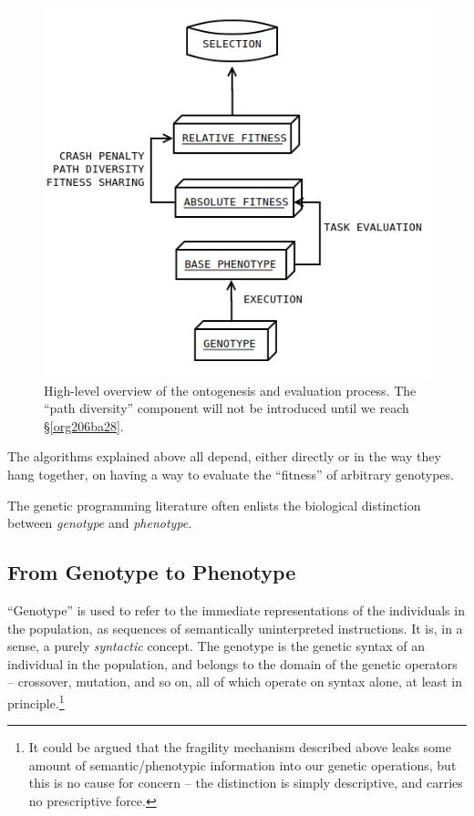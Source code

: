 \documentclass[12pt,glossary]{dalthesis}
\begin{document}
\begin{figure}[htbp]
\centering
\includegraphics[width=.9\linewidth]{../images/evaluation_model.png}
\caption{\label{fig:org589d021}
High-level overview of the ontogenesis and evaluation process. The ``path diversity'' component will not be introduced until we reach \S \ref{org206ba28}.}
\end{figure}

The algorithms explained above all depend, either directly or in the way they
hang together, on having a way to evaluate the ``fitness'' of arbitrary genotypes.

The genetic programming literature often enlists the biological distinction
between \emph{genotype} and \emph{phenotype}.

\subsection{From Genotype to Phenotype}
\label{sec:orgf649ce0}
\label{org89128b0}

``Genotype'' is used to refer to the immediate representations of the individuals
in the population, as sequences of semantically uninterpreted instructions. It
is, in a sense, a purely \emph{syntactic} concept. The genotype is the genetic syntax
of an individual in the population, and belongs to the domain of the genetic
operators -- crossover, mutation, and so on, all of which operate on syntax alone,
at least in principle.\footnote{It could be argued that the fragility mechanism described above leaks some
  amount of semantic/phenotypic information into our genetic operations, but
  this is no cause for concern -- the distinction is simply descriptive, and
  carries no prescriptive force.}
\end{document}
